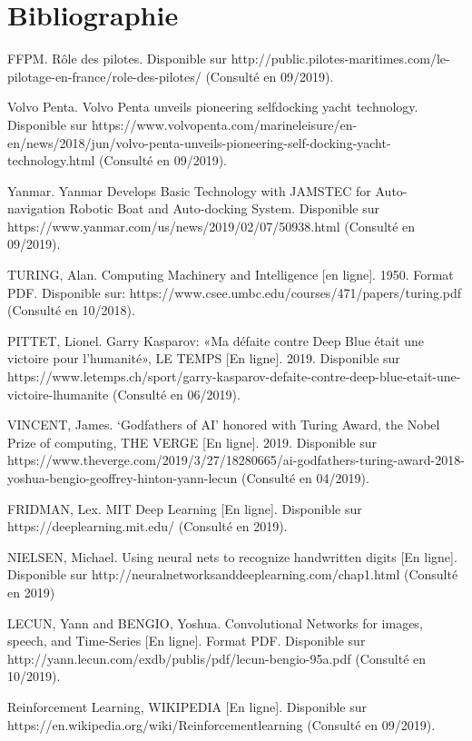 \documentclass[12pt,a4paper]{extarticle}
\begin{document}
\section*{{\color{SteelBlue} Bibliographie}}

\begin{enumerate}[label = {\bfseries [\arabic*] } ]

\item FFPM. Rôle des pilotes. Disponible sur http://public.pilotes-maritimes.com/le-pilotage-en-france/role-des-pilotes/ (Consulté en 09/2019).
\item Volvo Penta. Volvo Penta unveils pioneering selfdocking yacht technology. Disponible sur https://www.volvopenta.com/marineleisure/en-en/news/2018/jun/volvo-penta-unveils-pioneering-self-docking-yacht-technology.html (Consulté en 09/2019).
\item Yanmar. Yanmar Develops Basic Technology with JAMSTEC for Auto-navigation Robotic Boat and Auto-docking System. Disponible sur https://www.yanmar.com/us/news/2019/02/07/50938.html (Consulté en 09/2019).
\item TURING, Alan. Computing Machinery and Intelligence [en ligne]. 1950. Format PDF. Disponible sur: https://www.csee.umbc.edu/courses/471/papers/turing.pdf (Consulté en 10/2018).
\item PITTET, Lionel. Garry Kasparov: «Ma défaite contre Deep Blue était une victoire pour l’humanité», LE TEMPS [En ligne]. 2019. Disponible sur https://www.letemps.ch/sport/garry-kasparov-defaite-contre-deep-blue-etait-une-victoire-lhumanite (Consulté en 06/2019).
\item VINCENT, James. ‘Godfathers of AI’ honored with Turing Award, the Nobel Prize of computing, THE VERGE [En ligne]. 2019. Disponible sur https://www.theverge.com/2019/3/27/18280665/ai-godfathers-turing-award-2018-yoshua-bengio-geoffrey-hinton-yann-lecun (Consulté en 04/2019).
\item FRIDMAN, Lex. MIT Deep Learning [En ligne]. Disponible sur https://deeplearning.mit.edu/ (Consulté en 2019).
\item NIELSEN, Michael. Using neural nets to recognize handwritten digits [En ligne]. Disponible sur http://neuralnetworksanddeeplearning.com/chap1.html (Consulté en 2019)
\item LECUN, Yann and BENGIO, Yoshua. Convolutional Networks for images, speech, and Time-Series [En ligne]. Format PDF. Disponible sur http://yann.lecun.com/exdb/publis/pdf/lecun-bengio-95a.pdf (Consulté en 10/2019).
\item Reinforcement Learning, WIKIPEDIA [En ligne]. Disponible sur https://en.wikipedia.org/wiki/Reinforcement\textunderscore learning (Consulté en 09/2019).

\end{enumerate}
\end{document}
